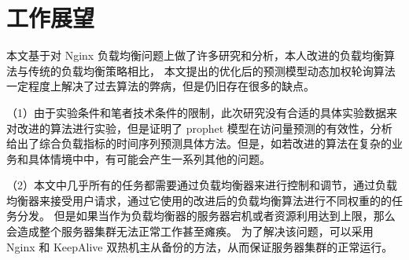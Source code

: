 \section{工作展望}

本文基于对 Nginx 负载均衡问题上做了许多研究和分析，本人改进的负载均衡算法与传统的负载均衡策略相比，
本文提出的优化后的预测模型动态加权轮询算法一定程度上解决了过去算法的弊病，但是仍旧存在很多的缺点。

（1）由于实验条件和笔者技术条件的限制，此次研究没有合适的具体实验数据来对改进的算法进行实验，但是证明了 prophet 模型在访问量预测的有效性，分析给出了综合负载指标的时间序列预测具体方法。但是，如若改进的算法在复杂的业务和具体情境中中，有可能会产生一系列其他的问题。

（2）本文中几乎所有的任务都需要通过负载均衡器来进行控制和调节，通过负载均衡器来接受用户请求，通过它使用的改进后的负载均衡算法进行不同权重的的任务分发。
但是如果当作为负载均衡器的服务器宕机或者资源利用达到上限，那么会造成整个服务器集群无法正常工作甚至瘫痪。
为了解决该问题，可以采用 Nginx 和 KeepAlive 双热机主从备份的方法，从而保证服务器集群的正常运行。
